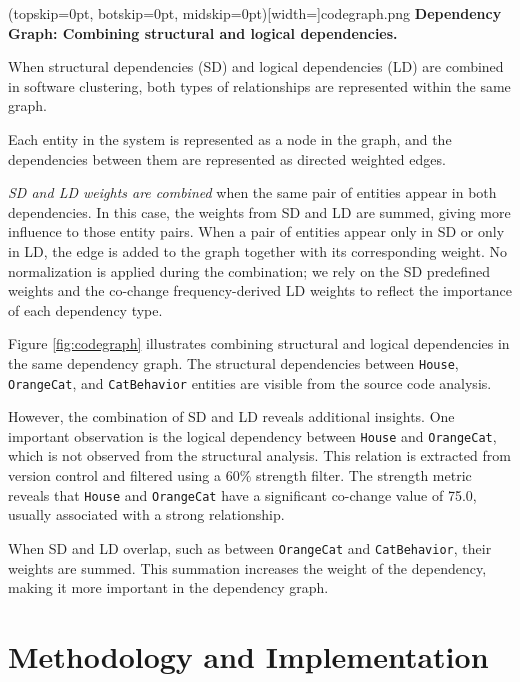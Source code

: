 \documentclass{ieeeaccess}
\begin{document}
\Figure[t!](topskip=0pt, botskip=0pt, midskip=0pt)[width=\textwidth]{codegraph.png}
{ \textbf{Dependency Graph: Combining structural and logical dependencies.}\label{fig:codegraph}}

When structural dependencies (SD) and logical dependencies (LD) are combined in software clustering, both types of relationships are represented within the same graph.

Each entity in the system is represented as a node in the graph, and the dependencies between them are represented as directed weighted edges.

\textit{SD and LD weights are combined} when the same pair of entities appear in both dependencies. In this case, the weights from SD and LD are summed, giving more influence to those entity pairs. When a pair of entities appear only in SD or only in LD, the edge is added to the graph together with its corresponding weight. No normalization is applied during the combination; we rely on the SD predefined weights and the co-change frequency-derived LD weights to reflect the importance of each dependency type.

Figure \ref{fig:codegraph} illustrates combining structural and logical dependencies in the same dependency graph. The structural dependencies between \texttt{House}, \texttt{OrangeCat}, and \texttt{CatBehavior} entities are visible from the source code analysis.

However, the combination of SD and LD reveals additional insights. One important observation is the logical dependency between \texttt{House} and \texttt{OrangeCat}, which is not observed from the structural analysis. This relation is extracted from version control and filtered using a 60\% strength filter. The strength metric reveals that \texttt{House} and \texttt{OrangeCat} have a significant co-change value of 75.0, usually associated with a strong relationship.

When SD and LD overlap, such as between \texttt{OrangeCat} and \texttt{CatBehavior}, their weights are summed. This summation increases the weight of the dependency, making it more important in the dependency graph.





\section{Methodology and Implementation}
\label{sec:methodology_implementation}
\end{document}
